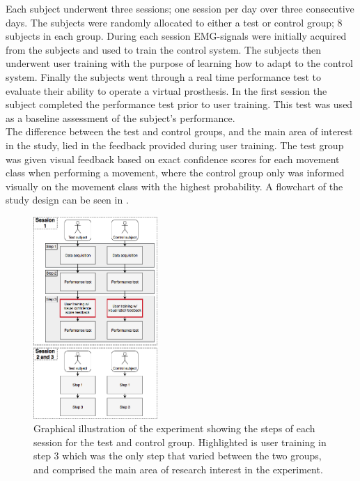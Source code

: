 Each subject underwent three sessions; one session per day over three consecutive days. The subjects were randomly allocated to either a test or control group; 8 subjects in each group. During each session EMG-signals were initially acquired from the subjects and used to train the control system. The subjects then underwent user training with the purpose of learning how to adapt to the control system. Finally the subjects went through a real time performance test to evaluate their ability to operate a virtual prosthesis. In the first session the subject completed the performance test prior to user training. This test was used as a baseline assessment of the subject's performance. \\
The difference between the test and control groups, and the main area of interest in the study, lied in the feedback provided during user training. The test group was given visual feedback based on exact confidence scores for each movement class when performing a movement, where the control group only was informed visually on the movement class with the highest probability. A flowchart of the study design can be seen in .


\begin{figure}[H]                                         
	\includegraphics[width=0.42\textwidth]{figures/Paper/Study_design}  
	\caption{Graphical illustration of the experiment showing the steps of each session for the test and control group. Highlighted is user training in step 3 which was the only step that varied between the two groups, and comprised the main area of research interest in the experiment.}
	\label{fig:P:std} 
\end{figure}